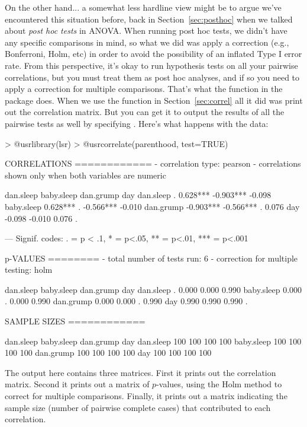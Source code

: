 On the other hand... a somewhat less hardline view might be to argue we've encountered this situation before, back in Section~\ref{sec:posthoc} when we talked about {\it post hoc tests} in ANOVA. When running post hoc tests, we didn't have any specific comparisons in mind, so what we did was apply a correction (e.g., Bonferroni, Holm, etc) in order to avoid the possibility of an inflated Type I error rate. From this perspective, it's okay to run hypothesis tests on all your pairwise correlations, but you must treat them as post hoc analyses, and if so you need to apply a correction for multiple comparisons. That's what the  function in the  package does. When we use the  function in Section~\ref{sec:correl} all it did was print out the correlation matrix. But you can get it to output the results of all the pairwise tests as well by specifying . Here's what happens with the  data:
\begin{rblock1}
> @usr{library(lsr)}
> @usr{correlate(parenthood, test=TRUE)}

CORRELATIONS
============
- correlation type:  pearson 
- correlations shown only when both variables are numeric

           dan.sleep    baby.sleep    dan.grump       day   
dan.sleep          .         0.628***    -0.903*** -0.098   
baby.sleep     0.628***          .       -0.566*** -0.010   
dan.grump     -0.903***     -0.566***         .     0.076   
day           -0.098        -0.010        0.076         .   

---
Signif. codes: . = p < .1, * = p<.05, ** = p<.01, *** = p<.001


p-VALUES
========
- total number of tests run:  6 
- correction for multiple testing:  holm 

           dan.sleep baby.sleep dan.grump   day
dan.sleep          .      0.000     0.000 0.990
baby.sleep     0.000          .     0.000 0.990
dan.grump      0.000      0.000         . 0.990
day            0.990      0.990     0.990     .


SAMPLE SIZES
============

           dan.sleep baby.sleep dan.grump day
dan.sleep        100        100       100 100
baby.sleep       100        100       100 100
dan.grump        100        100       100 100
day              100        100       100 100
\end{rblock1}
The output here contains three matrices. First it prints out the correlation matrix. Second it prints out a matrix of $p$-values, using the Holm method to correct for multiple comparisons. Finally, it prints out a matrix indicating the sample size (number of pairwise complete cases) that contributed to each correlation. 

